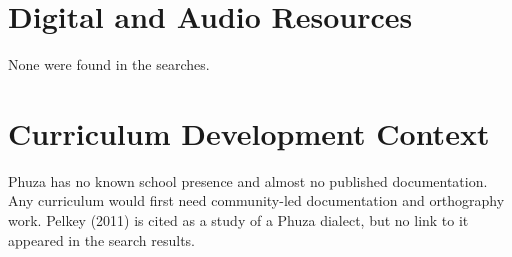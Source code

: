 \documentclass[12pt]{article}
\begin{document}
\section{Digital and Audio Resources}
None were found in the searches.

\section{Curriculum Development Context}
Phuza has no known school presence and almost no published documentation. Any curriculum would first need community-led documentation and orthography work. Pelkey (2011) is cited as a study of a Phuza dialect, but no link to it appeared in the search results.
\end{document}
